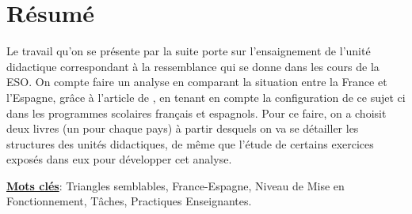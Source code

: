 \chapter*{\centering Résumé}

Le travail qu'on se présente par la suite porte sur l'ensaignement de l'unité didactique correspondant à la ressemblance qui se donne dans les cours de la ESO. On compte faire un analyse en comparant la situation entre la France et l'Espagne, grâce à l'article de \cite{Horoks}, en tenant en compte la configuration de ce sujet ci dans les programmes scolaires français et espagnols. Pour ce faire, on a choisit deux livres (un pour chaque pays) à partir desquels on va se détailler les structures des unités didactiques, de même que l'étude de certains exercices exposés dans eux pour développer cet analyse.


\underline{\textbf{Mots clés}}: Triangles semblables, France-Espagne, Niveau de Mise en Fonctionnement, Tâches, Practiques Enseignantes.